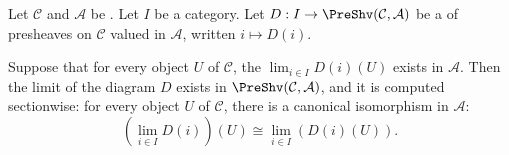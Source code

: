\begin{theorem}
\label{theorem:limits_of_presheaf_diagrams_valued_in_a_category_are_computed_sectionwise}
Let $\mathcal{C}$ and $\mathcal{A}$ be . Let $I$ be a category. Let $D: I \to \PreShv(\mathcal{C}, \mathcal{A})$ be a  of presheaves on $\mathcal{C}$ valued in $\mathcal{A}$, written $i \mapsto D(i)$.

Suppose that for every object $U$ of $\mathcal{C}$, the  $\lim_{i \in I} D(i)(U)$ exists in $\mathcal{A}$. Then the limit of the diagram $D$ exists in $\PreShv(\mathcal{C}, \mathcal{A})$, and it is computed sectionwise: for every object $U$ of $\mathcal{C}$, there is a canonical isomorphism in $\mathcal{A}$:
\[
\left( \lim_{i \in I} D(i) \right)(U) \cong \lim_{i \in I} (D(i)(U)).
\]
\end{theorem}

